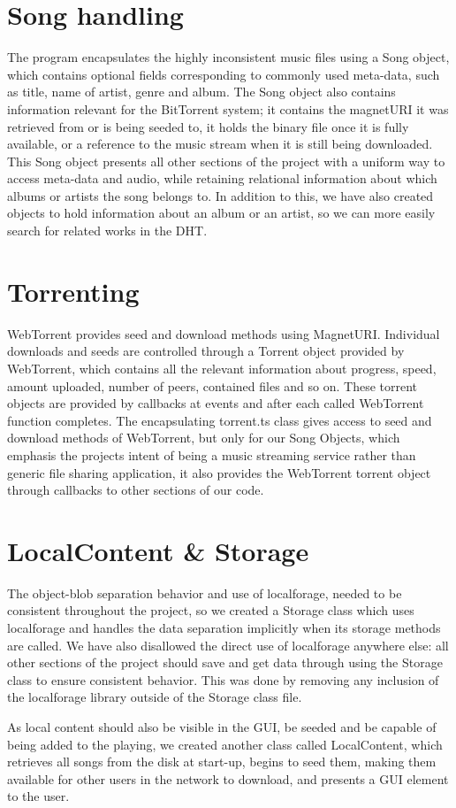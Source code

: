 \section{Song handling}
The program encapsulates the highly inconsistent music files using a Song object,
which contains optional fields corresponding to commonly used meta-data, 
such as title, name of artist, genre and album. 
The Song object also contains information relevant for the BitTorrent system; 
it contains the magnetURI it was retrieved from or is being seeded to, 
it holds the binary file once it is fully available, 
or a reference to the music stream when it is still being downloaded.
This Song object presents all other sections of the project with a uniform way to access meta-data and audio, 
while retaining relational information about which albums or artists the song belongs to. In addition to this, 
we have also created objects to hold information about an album or an artist, 
so we can more easily search for related works in the \acs{DHT}.
\newline

\section{Torrenting}
WebTorrent provides seed and download methods using MagnetURI.
Individual downloads and seeds are controlled through a Torrent object provided by WebTorrent,
which contains all the relevant information about progress, 
speed, amount uploaded, number of peers, contained files and so on.
These torrent objects are provided by callbacks at events
and after each called WebTorrent function completes.
The encapsulating torrent.ts class gives access to seed and download methods of WebTorrent, 
but only for our Song Objects, which emphasis the projects intent of being a music streaming service 
rather than generic file sharing application, 
it also provides the WebTorrent torrent object through callbacks to other sections of our code.
\newline

\section{LocalContent \& Storage}
The object-blob separation behavior and use of localforage,
needed to be consistent throughout the project, 
so we created a Storage class which uses localforage and handles the data separation implicitly when its storage methods are called.
We have also disallowed the direct use of localforage anywhere else:
all other sections of the project should save and get data through using the Storage class to ensure consistent behavior. 
This was done by removing any inclusion of the localforage library outside of the Storage class file.

As local content should also be visible in the \acs{GUI}, 
be seeded and be capable of being added to the playing,
we created another class called LocalContent,
which retrieves all songs from the disk at start-up,
begins to seed them, making them available for other users in the network to download,
and presents a \acs{GUI} element to the user.
